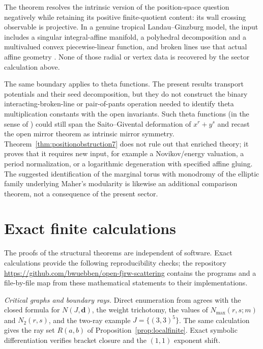 \documentclass[11pt]{amsart}
\theoremstyle{definition}
\theoremstyle{remark}
\begin{document}
The theorem resolves the intrinsic version of the position-space question
negatively while retaining its positive finite-quotient content: its wall
crossing observable is projective.  In a
genuine tropical Landau--Ginzburg model, the input includes a singular
integral-affine manifold, a polyhedral decomposition and a multivalued convex
piecewise-linear function, and broken lines use that actual affine geometry
\cite{CPS}.  None of those radial or vertex data is recovered by
the sector calculation above.

The same boundary applies to theta functions.  The present results transport
potentials and their seed decomposition, but they do not construct the binary
interacting-broken-line or pair-of-pants operation needed to identify theta
multiplication constants with the open invariants.  Such theta functions (in
the sense of \cite{GHK15,GS-intrinsic}) could still span the Saito--Givental
deformation of $x^r+y^s$ and recast the open mirror theorem
\cite[Thm.~0.3]{GKT} as intrinsic mirror symmetry.  Theorem~\ref{thm:positionobstruction7}
does not rule out that enriched theory; it proves that it requires new input,
for example a Novikov/energy valuation, a period normalization, or a
logarithmic degeneration with specified affine gluing.  The suggested
identification of the marginal torus with monodromy of the elliptic family
underlying Maher's modularity \cite{Maher} is likewise an additional comparison
theorem, not a consequence of the present sector.

\section{Exact finite calculations}
\label{sec:cert}

The proofs of the structural theorems are independent of software.  Exact
calculations provide the following reproducibility checks; the repository
\url{https://github.com/bwuebben/open-fjrw-scattering} contains the programs
and a file-by-file map from these mathematical statements to their
implementations.

\emph{Critical graphs and boundary rays.}
Direct enumeration from \cite[Not.~2.40]{GKT} agrees with the closed formula
for $N(J,\mathbf d)$, the weight trichotomy, the values of
$N_{\max}(r,s;m)$ and $N_2(r,s)$, and the two-ray example
$J=\{(3,3)^5\}$.  The same calculation gives the ray set
$R(a,b)$ of Proposition~\ref{prop:localfinite}.  Exact symbolic
differentiation verifies bracket closure and the $(1,1)$ exponent shift.
\end{document}
